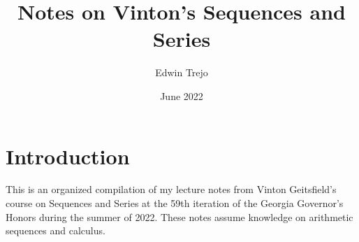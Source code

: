 \documentclass{article}
\title{Notes on Vinton's Sequences and Series}
\author{Edwin Trejo}
\date{June 2022}
\begin{document}
\maketitle

\section{Introduction}

This is an organized compilation of my lecture notes from Vinton Geitsfield's course on Sequences and Series at the 59th iteration of the Georgia Governor's Honors during the summer of 2022. 
These notes assume knowledge on arithmetic sequences and calculus. 










\end{document}
